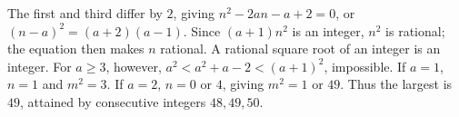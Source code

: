 The first and third differ by $2$, giving $n^2-2an-a+2=0$, or $(n-a)^2=(a+2)(a-1)$. Since $(a+1)n^2$ is an integer, $n^2$ is rational; the equation then makes $n$ rational. A rational square root of an integer is an integer. For $a\ge3$, however, $a^2<a^2+a-2<(a+1)^2$, impossible. If $a=1$, $n=1$ and $m^2=3$. If $a=2$, $n=0$ or $4$, giving $m^2=1$ or $49$. Thus the largest is $\boxed{49}$, attained by consecutive integers $48,49,50$.
